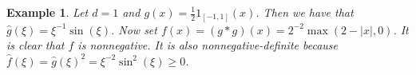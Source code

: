 \documentclass[sn-mathphys]{sn-jnl}%
\newcommand{\BR}{\mathbb{R}}
\newcommand{\ud}{\ensuremath{\mathrm{d}}}
\numberwithin{equation}{section}
\theoremstyle{thmstyleone}%
\theoremstyle{thmstyletwo}%
\newtheorem{example}{Example}[section]%
\theoremstyle{thmstylethree}%
\begin{document}


\begin{example}\label{Ex:nonnegative}
  Let $d = 1$ and $g(x) = \frac{1}{2}1_{[-1,1]}(x)$. Then we have that $ \widehat{g}(\xi) =
  \xi^{-1}\sin(\xi)$. Now set $f(x) = \left(g*g\right)(x) = 2^{-2}\max(2-\lvert x \rvert,0)$. It is clear that
  $f$ is nonnegative. It is also nonnegative-definite because $\widehat{f}(\xi) = \widehat{g}(\xi)^2
  = \xi^{-2}\sin^2 (\xi)\ge 0$.
\end{example}


\end{document}
